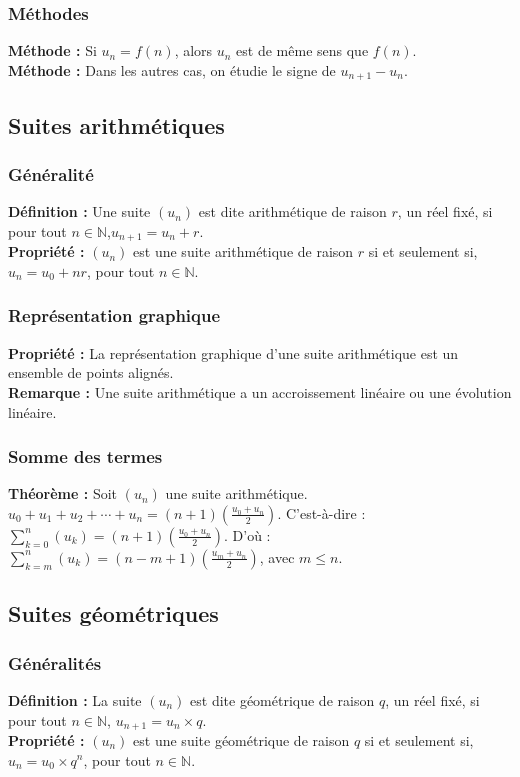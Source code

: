 \documentclass[a4paper,titlepage]{article}
\begin{document}
        \subsubsection{Méthodes}
            \textbf{Méthode :} Si $u_{n}=f\left(n\right)$, alors $u_{n}$ est de même sens que $f\left(n\right)$.
            \\
            \textbf{Méthode :} Dans les autres cas, on étudie le signe de $u_{n+1}-u_{n}$.
    \subsection{Suites arithmétiques}
        \subsubsection{Généralité}
            \textbf{Définition :} Une suite $\left(u_{n}\right)$ est dite arithmétique de raison $r$, un réel fixé, si pour tout $n\in\mathbb{N}$,\linebreak$u_{n+1}=u_{n}+r$.
            \\
            \textbf{Propriété :} $\left(u_{n}\right)$ est une suite arithmétique de raison $r$ si et seulement si, $u_{n}=u_{0}+nr$, pour tout $n\in\mathbb{N}$.
        \subsubsection{Représentation graphique}
            \textbf{Propriété :} La représentation graphique d’une suite arithmétique est un ensemble de points alignés.
            \\
            \textbf{Remarque :} Une suite arithmétique a un accroissement linéaire ou une évolution linéaire.
        \subsubsection{Somme des termes}
            \textbf{Théorème :} Soit $\left(u_{n}\right)$ une suite arithmétique. $u_{0}+u_{1}+u_{2}+\cdots+u_{n}=\left(n+1\right)\left(\frac{u_{0}+u_{n}}{2}\right)$. C’est-à-dire : $\sum\limits_{k=0}^{n}\left(u_{k}\right)=\left(n+1\right)\left(\frac{u_{0}+u_{n}}{2}\right)$. D’où : $\sum\limits_{k=m}^{n}\left(u_{k}\right)=\left(n-m+1\right)\left(\frac{u_{m}+u_{n}}{2}\right)$, avec $m\leqslant n$.
    \subsection{Suites géométriques}
        \subsubsection{Généralités}
            \textbf{Définition :} La suite $\left(u_{n}\right)$ est dite géométrique de raison $q$, un réel fixé, si pour tout $n\in\mathbb{N}$, $u_{n+1}=u_{n}\times q$.
            \\
            \textbf{Propriété :} $\left(u_{n}\right)$ est une suite géométrique de raison $q$ si et seulement si, $u_{n}=u_{0}\times q^{n}$, pour tout $n\in\mathbb{N}$.
\end{document}
